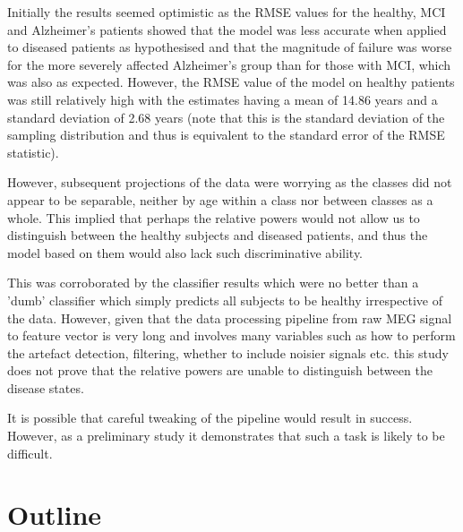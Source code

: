 Initially the results seemed optimistic as the RMSE values for the healthy, MCI and Alzheimer's patients showed that the model was less accurate when applied to diseased patients as hypothesised and that the magnitude of failure was worse for the more severely affected Alzheimer's group than for those with MCI, which was also as expected. However, the RMSE value of the model on healthy patients was still relatively high with the estimates having a mean of 14.86 years and a standard deviation of 2.68 years (note that this is the standard deviation of the sampling distribution and thus is equivalent to the standard error of the RMSE statistic).

However, subsequent projections of the data were worrying as the classes did not appear to be separable, neither by age within a class nor between classes as a whole. This implied that perhaps the relative powers would not allow us to distinguish between the healthy subjects and diseased patients, and thus the model based on them would also lack such discriminative ability. 

This was corroborated by the classifier results which were no better than a 'dumb' classifier which simply predicts all subjects to be healthy irrespective of the data. However, given that the data processing pipeline from raw MEG signal to feature vector is very long and involves many variables such as how to perform the artefact detection, filtering, whether to include noisier signals etc. this study does not prove that the relative powers are unable to distinguish between the disease states.

It is possible that careful tweaking of the pipeline would result in success. However, as a preliminary study it demonstrates that such a task is likely to be difficult.



\newpage

\section{Outline}

